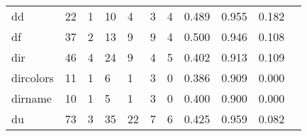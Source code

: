 \begin{longtable}{lp{1.2cm}p{1.2cm}p{1.2cm}p{1.2cm}p{1.2cm}p{1.2cm}p{1.2cm}p{1.2cm}p{1.2cm}p{1.2cm}}
dd        &                                    22 &                                                  1 &                                                 10 &                                                  4 &                                                  3 &                                                  4 &                                         0.489 &                                              0.955 &                                              0.182 \\
df        &                                    37 &                                                  2 &                                                 13 &                                                  9 &                                                  9 &                                                  4 &                                         0.500 &                                              0.946 &                                              0.108 \\
dir       &                                    46 &                                                  4 &                                                 24 &                                                  9 &                                                  4 &                                                  5 &                                         0.402 &                                              0.913 &                                              0.109 \\
dircolors &                                    11 &                                                  1 &                                                  6 &                                                  1 &                                                  3 &                                                  0 &                                         0.386 &                                              0.909 &                                              0.000 \\
dirname   &                                    10 &                                                  1 &                                                  5 &                                                  1 &                                                  3 &                                                  0 &                                         0.400 &                                              0.900 &                                              0.000 \\
du        &                                    73 &                                                  3 &                                                 35 &                                                 22 &                                                  7 &                                                  6 &                                         0.425 &                                              0.959 &                                              0.082 \\

\end{longtable}

